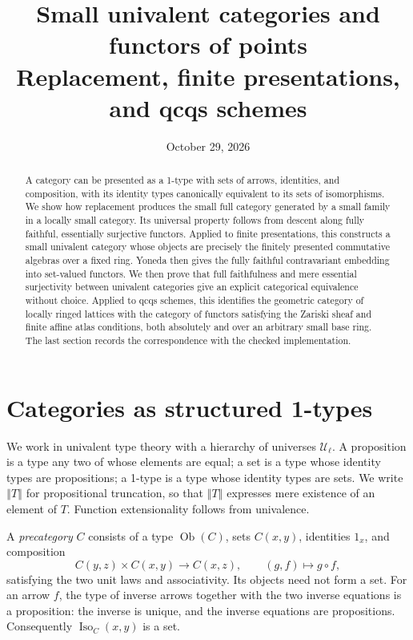 \documentclass[11pt]{amsart}
\title[Univalent categories and functors of points]{Small univalent categories and functors of points\\
Replacement, finite presentations, and qcqs schemes}
\date{October 29, 2026}
\theoremstyle{definition}
\theoremstyle{remark}
\newcommand{\UU}{\mathcal U}
\newcommand{\Iso}{\operatorname{Iso}}
\newcommand{\Ob}{\operatorname{Ob}}
\newcommand{\tr}[1]{\left\Vert #1\right\Vert}
\begin{document}
\raggedbottom
\begin{abstract}
A category can be presented as a 1-type with sets of arrows, identities,
and composition, with its identity types canonically equivalent to its
sets of isomorphisms. We show how replacement produces the small full
category generated by a small family in a locally small category. Its
universal property follows from descent along fully faithful, essentially
surjective functors. Applied to finite presentations, this constructs a
small univalent category whose objects are precisely the finitely
presented commutative algebras over a fixed ring. Yoneda then gives the
fully faithful contravariant embedding into set-valued functors. We then
prove that full faithfulness and mere essential surjectivity between
univalent categories give an explicit categorical equivalence without
choice. Applied to qcqs schemes, this identifies the geometric category
of locally ringed lattices with the category of functors satisfying the
Zariski sheaf and finite affine atlas conditions, both absolutely and
over an arbitrary small base ring. The last section
records the correspondence with the checked implementation.
\end{abstract}
\maketitle

\section{Categories as structured 1-types}

We work in univalent type theory with a hierarchy of universes $\UU_\ell$.
A proposition is a type any two of whose elements are equal; a set is a
type whose identity types are propositions; a 1-type is a type whose
identity types are sets. We write $\tr{T}$ for propositional truncation,
so that $\tr{T}$ expresses mere existence of an element of $T$.
Function extensionality follows from univalence.

A \emph{precategory} $C$ consists of a type $\Ob(C)$, sets $C(x,y)$,
identities $1_x$, and composition
\[
 C(y,z)\times C(x,y)\longrightarrow C(x,z),\qquad (g,f)\longmapsto g\circ f,
\]
satisfying the two unit laws and associativity. Its objects need not form
a set. For an arrow $f$, the type of inverse arrows together with the two
inverse equations is a proposition: the inverse is unique, and the
inverse equations are propositions. Consequently $\Iso_C(x,y)$ is a set.
\end{document}
